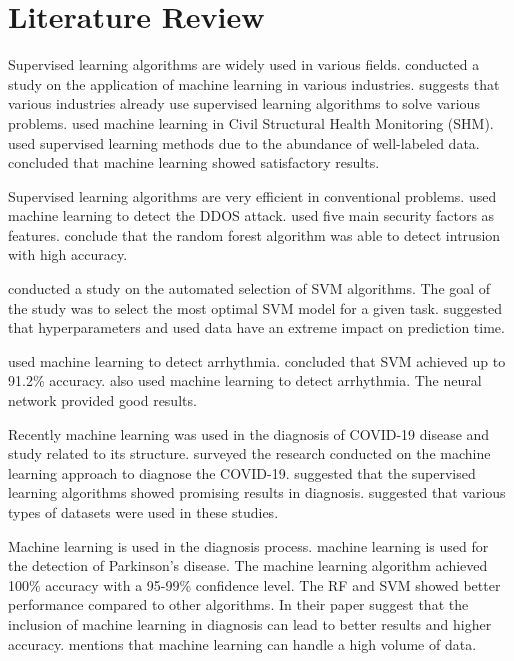 \section{Literature Review}\label{sec:literature_review}

Supervised learning algorithms are widely used in various fields. \cite*{ref_paper_14} conducted a study on the application of machine learning in various industries. \citeauthor{ref_paper_14} suggests that various industries already use supervised learning algorithms to solve various problems. \cite*{ref_paper_6} used machine learning in Civil Structural Health Monitoring (SHM). \citeauthor{ref_paper_6} used supervised learning methods due to the abundance of well-labeled data. \citeauthor{ref_paper_6} concluded that machine learning showed satisfactory results.

Supervised learning algorithms are very efficient in conventional problems. \cite*{ref_paper_9} used machine learning to detect the DDOS attack. \citeauthor{ref_paper_9} used five main security factors as features. \citeauthor{ref_paper_9} conclude that the random forest algorithm was able to detect intrusion with high accuracy.

\cite*{ref_paper_2} conducted a study on the automated selection of SVM algorithms. The goal of the study was to select the most optimal SVM model for a given task. \citeauthor{ref_paper_2} suggested that hyperparameters and used data have an extreme impact on prediction time.

\cite*{ref_paper_38} used machine learning to detect arrhythmia. \citeauthor{ref_paper_38} concluded that SVM achieved up to 91.2\% accuracy. \cite*{ref_paper_16} also used machine learning to detect arrhythmia. The neural network provided good results.

Recently machine learning was used in the diagnosis of COVID-19 disease and study related to its structure. \cite*{ref_paper_20} surveyed the research conducted on the machine learning approach to diagnose the COVID-19. \citeauthor{ref_paper_20} suggested that the supervised learning algorithms showed promising results in diagnosis. \citeauthor{ref_paper_20} suggested that various types of datasets were used in these studies.

Machine learning is used in the diagnosis process. \cite*{ref_paper_34} machine learning is used for the detection of Parkinson's disease. The machine learning algorithm achieved 100\% accuracy with a 95-99\% confidence level. The RF and SVM showed better performance compared to other algorithms. In their paper \cite*{ref_paper_15} suggest that the inclusion of machine learning in diagnosis can lead to better results and higher accuracy. \citeauthor{ref_paper_15} mentions that machine learning can handle a high volume of data.

